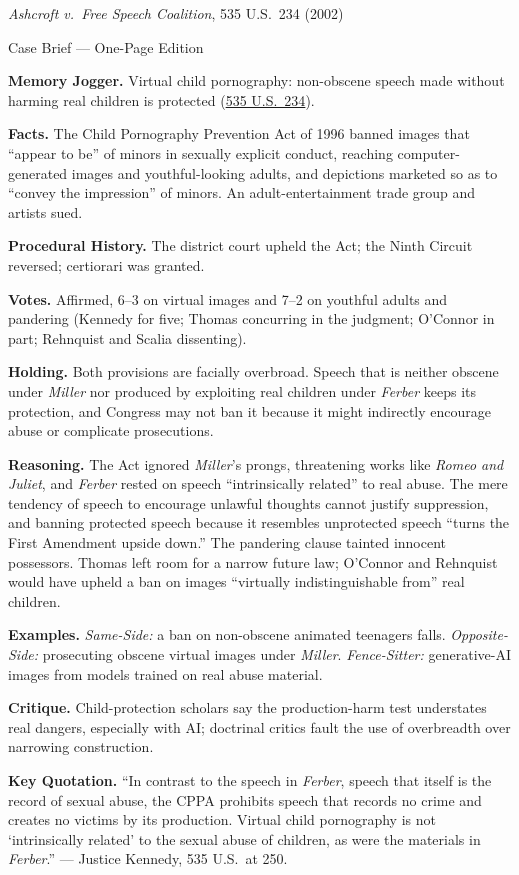 \documentclass[12pt]{article}
\begin{document}
\begin{center}
{\Large \textit{Ashcroft v.\ Free Speech Coalition}, 535 U.S.\ 234 (2002)\par}
\vspace{0.3em}
{\normalsize Case Brief --- One-Page Edition\par}
\end{center}

\textbf{Memory Jogger.} Virtual child pornography: non-obscene speech made without harming real children is protected (\href{https://supreme.justia.com/cases/federal/us/535/234/}{535 U.S.\ 234}).

\textbf{Facts.} The Child Pornography Prevention Act of 1996 banned images that ``appear to be'' of minors in sexually explicit conduct, reaching computer-generated images and youthful-looking adults, and depictions marketed so as to ``convey the impression'' of minors. An adult-entertainment trade group and artists sued.

\textbf{Procedural History.} The district court upheld the Act; the Ninth Circuit reversed; certiorari was granted.

\textbf{Votes.} Affirmed, 6--3 on virtual images and 7--2 on youthful adults and pandering (Kennedy for five; Thomas concurring in the judgment; O'Connor in part; Rehnquist and Scalia dissenting).

\textbf{Holding.} Both provisions are facially overbroad. Speech that is neither obscene under \textit{Miller} nor produced by exploiting real children under \textit{Ferber} keeps its protection, and Congress may not ban it because it might indirectly encourage abuse or complicate prosecutions.

\textbf{Reasoning.} The Act ignored \textit{Miller}'s prongs, threatening works like \textit{Romeo and Juliet}, and \textit{Ferber} rested on speech ``intrinsically related'' to real abuse. The mere tendency of speech to encourage unlawful thoughts cannot justify suppression, and banning protected speech because it resembles unprotected speech ``turns the First Amendment upside down.'' The pandering clause tainted innocent possessors. Thomas left room for a narrow future law; O'Connor and Rehnquist would have upheld a ban on images ``virtually indistinguishable from'' real children.

\textbf{Examples.} \emph{Same-Side:} a ban on non-obscene animated teenagers falls. \emph{Opposite-Side:} prosecuting obscene virtual images under \textit{Miller}. \emph{Fence-Sitter:} generative-AI images from models trained on real abuse material.

\textbf{Critique.} Child-protection scholars say the production-harm test understates real dangers, especially with AI; doctrinal critics fault the use of overbreadth over narrowing construction.

\textbf{Key Quotation.} ``In contrast to the speech in \textit{Ferber}, speech that itself is the record of sexual abuse, the CPPA prohibits speech that records no crime and creates no victims by its production. Virtual child pornography is not `intrinsically related' to the sexual abuse of children, as were the materials in \textit{Ferber}.'' --- Justice Kennedy, 535 U.S.\ at 250.
\end{document}
